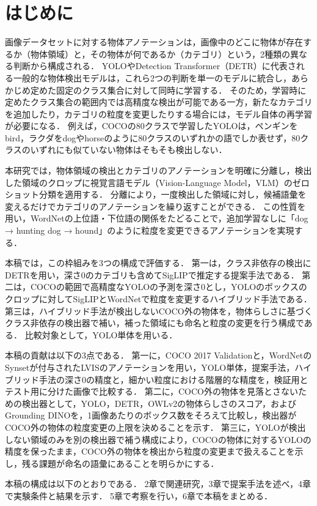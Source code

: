 \section{はじめに}
画像データセットに対する物体アノテーションは，画像中のどこに物体が存在するか（物体領域）と，その物体が何であるか（カテゴリ）という，2種類の異なる判断から構成される．
YOLO\cite{ref_YOLO}やDetection Transformer（DETR）\cite{ref_DETR}に代表される一般的な物体検出モデルは，これら2つの判断を単一のモデルに統合し，あらかじめ定めた固定のクラス集合に対して同時に学習する．
そのため，学習時に定めたクラス集合の範囲内では高精度な検出が可能である一方，新たなカテゴリを追加したり，カテゴリの粒度を変更したりする場合には，モデル自体の再学習が必要になる．
例えば，COCO\cite{ref_COCO}の80クラスで学習したYOLOは，ペンギンをbird，ラクダをdogやhorseのように80クラスのいずれかの語でしか表せず，80クラスのいずれにも似ていない物体はそもそも検出しない．

本研究では，物体領域の検出とカテゴリのアノテーションを明確に分離し，検出した領域のクロップに視覚言語モデル（Vision-Language Model，VLM）のゼロショット分類を適用する．
分離により，一度検出した領域に対し，候補語彙を変えるだけでカテゴリのアノテーションを繰り返すことができる．
この性質を用い，WordNet\cite{ref_WordNet}の上位語・下位語の関係をたどることで，追加学習なしに「dog → hunting dog → hound」のように粒度を変更できるアノテーションを実現する．

本稿では，この枠組みを3つの構成で評価する．
第一は，クラス非依存の検出にDETRを用い，深さ0のカテゴリも含めてSigLIP\cite{ref_SigLIP}で推定する提案手法である．
第二は，COCOの範囲で高精度なYOLOの予測を深さ0とし，YOLOのボックスのクロップに対してSigLIPとWordNetで粒度を変更するハイブリッド手法である．
第三は，ハイブリッド手法が検出しないCOCO外の物体を，物体らしさに基づくクラス非依存の検出器で補い，補った領域にも命名と粒度の変更を行う構成である．
比較対象として，YOLO単体を用いる．

本稿の貢献は以下の3点である．
第一に，COCO 2017 Validationと，WordNetのSynsetが付与されたLVIS\cite{ref_LVIS}のアノテーションを用い，YOLO単体，提案手法，ハイブリッド手法の深さ0の精度と，細かい粒度における階層的な精度を，検証用とテスト用に分けた画像で比較する．
第二に，COCO外の物体を見落とさないための検出器として，YOLO，DETR，OWLv2\cite{ref_OWLv2}の物体らしさのスコア，およびGrounding DINO\cite{ref_GroundingDINO}を，1画像あたりのボックス数をそろえて比較し，検出器がCOCO外の物体の粒度変更の上限を決めることを示す．
第三に，YOLOが検出しない領域のみを別の検出器で補う構成により，COCOの物体に対するYOLOの精度を保ったまま，COCO外の物体を検出から粒度の変更まで扱えることを示し，残る課題が命名の語彙にあることを明らかにする．

本稿の構成は以下のとおりである．
2章で関連研究，3章で提案手法を述べ，4章で実験条件と結果を示す．
5章で考察を行い，6章で本稿をまとめる．
